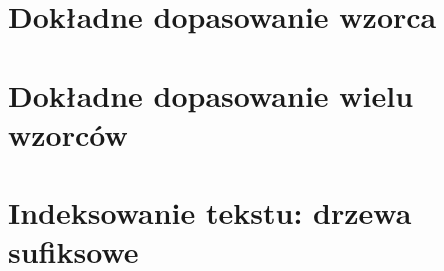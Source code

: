 





\pagestyle{scrheadings} %

\cleardoublepage %

\cleardoublepage


\cleardoublepage



\cleardoublepage


\part{Dokładne dopasowanie wzorca}

\cleardoublepage


\part{Dokładne dopasowanie wielu wzorców}

\cleardoublepage


\part{Indeksowanie tekstu: drzewa sufiksowe}

\cleardoublepage


